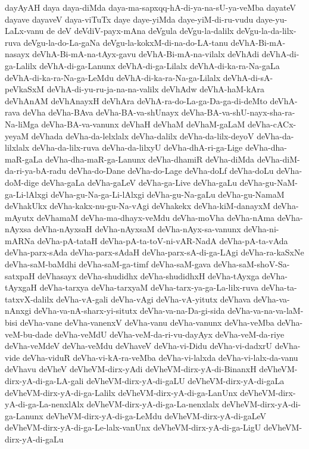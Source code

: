 {dayAyAH
daya
daya-diMda
daya-ma-sapxqq-hA-di-ya-na-sU-ya-veMba
dayateV
dayave
dayaveV
daya-viTuTx
daye
daye-yiMda
daye-yiM-di-ru-vudu
daye-yu-LaLx-vanu
de
deV
deVdiV-payx-mAna
deVgula
deVgu-la-dalilx
deVgu-la-da-lilx-ruva
deVgu-la-do-La-gaNa
deVgu-la-kokxM-di-na-do-LA-tanu
deVhA-Bi-mA-nasayx
deVhA-Bi-mA-na-tAyx-gavu
deVhA-Bi-mA-na-vilalx
deVhAdi
deVhA-di-ga-Lalilx
deVhA-di-ga-Lanunx
deVhA-di-ga-Lilalx
deVhA-di-ka-ra-Na-gaLa
deVhA-di-ka-ra-Na-ga-LeMdu
deVhA-di-ka-ra-Na-ga-Lilalx
deVhA-di-sA-peVkaSxM
deVhA-di-yu-ru-ja-na-na-valilx
deVhAdw
deVhA-haM-kAra
deVhAnAM
deVhAnayxH
deVhAra
deVhA-ra-do-La-ga-Da-ga-di-deMto
deVhA-rava
deVha
deVha-BAva
deVha-BA-va-shUnayx
deVha-BA-va-shU-nayx-sha-ra-Na-liMga
deVha-BA-va-vanunx
deVhaH
deVhaM
deVhaM-gaLaM
deVha-cACx-yeyaM
deVhada
deVha-da-lelxlalx
deVha-dalilx
deVha-da-lilx-deyoV
deVha-da-lilxlalx
deVha-da-lilx-ruva
deVha-da-lilxyU
deVha-dhA-ri-ga-Lige
deVha-dha-maR-gaLa
deVha-dha-maR-ga-Lanunx
deVha-dhamiR
deVha-diMda
deVha-diM-da-ri-ya-bA-radu
deVha-do-Dane
deVha-do-Lage
deVha-doLf
deVha-doLu
deVha-doM-dige
deVha-gaLa
deVha-gaLeV
deVha-ga-Live
deVha-gaLu
deVha-gu-NaM-ga-Li-lAlxgi
deVha-gu-Na-ga-Li-lAlxgi
deVha-gu-Na-gaLu
deVha-gu-NamaM
deVhakUkx
deVha-kakx-nu-gu-Na-vAgi
deVhakekx
deVha-kiM-danayxM
deVha-mAyutx
deVhamaM
deVha-ma-dhayx-veMdu
deVha-moVha
deVha-nAma
deVha-nAyxsa
deVha-nAyxsaH
deVha-nAyxsaM
deVha-nAyx-sa-vanunx
deVha-ni-mARNa
deVha-pA-tataH
deVha-pA-ta-toV-ni-vAR-NadA
deVha-pA-ta-vAda
deVha-parx-sAda
deVha-parx-sAdaH
deVha-parx-sA-di-ga-LAgi
deVha-ra-kaSxNe
deVha-saM-baMdhi
deVha-saM-ga-timf
deVha-saM-gava
deVha-saM-shoV-Sa-satxpaH
deVhasayx
deVha-shudidhx
deVha-shudidhxH
deVha-tAyxga
deVha-tAyxgaH
deVha-tarxya
deVha-tarxyaM
deVha-tarx-ya-ga-La-lilx-ruva
deVha-ta-tatxvX-dalilx
deVha-vA-gali
deVha-vAgi
deVha-vA-yitutx
deVhava
deVha-va-nAnxgi
deVha-va-nA-sharx-yi-situtx
deVha-va-na-Da-gi-sida
deVha-va-na-va-laM-bisi
deVha-vane
deVha-vanenxV
deVha-vanu
deVha-vanunx
deVha-veMba
deVha-veM-bu-dade
deVha-veMdU
deVha-veM-da-ri-vu-dayAyx
deVha-veM-da-riye
deVha-veMdeV
deVha-veMdu
deVhaveV
deVha-vi-Didu
deVha-vi-dadxrU
deVha-vide
deVha-viduR
deVha-vi-kA-ra-veMba
deVha-vi-lalxda
deVha-vi-lalx-da-vanu
deVhavu
deVheV
deVheVM-dirx-yAdi
deVheVM-dirx-yA-di-BinanxH
deVheVM-dirx-yA-di-ga-LA-gali
deVheVM-dirx-yA-di-gaLU
deVheVM-dirx-yA-di-gaLa
deVheVM-dirx-yA-di-ga-Lalilx
deVheVM-dirx-yA-di-ga-LanUnx
deVheVM-dirx-yA-di-ga-La-nenxlAlx
deVheVM-dirx-yA-di-ga-La-nenxlalx
deVheVM-dirx-yA-di-ga-Lanunx
deVheVM-dirx-yA-di-ga-LeMdu
deVheVM-dirx-yA-di-gaLeV
deVheVM-dirx-yA-di-ga-Le-lalx-vanUnx
deVheVM-dirx-yA-di-ga-LigU
deVheVM-dirx-yA-di-gaLu
}

